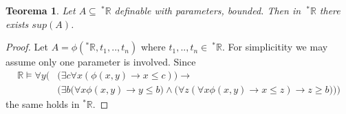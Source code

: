 \documentclass[11pt,a4paper]{article}
\newtheorem{theorem}{Teorema}
\theoremstyle{definition}
\theoremstyle{remark}
\begin{document}
\begin{theorem}

	Let $A \subseteq \ ^{*}\mathbb{R}$ definable with parameters, bounded. Then in $ \ ^{*}\mathbb{R}$ there exists $sup(A)$.
  
\end{theorem}

\begin{proof}

	Let $A = \phi(^{*}\mathbb{R},t_1,..,t_n)$ where $t_1,..,t_n \in \ ^{*}\mathbb{R}$.
	For simplicitity we may assume only one parameter is involved.
	Since
	\begin{align*}
		\mathbb{R} \models \forall y \bigg( & \big( \exists c \forall x (\phi(x,y) \to x \leq c) \big) \to \\
						& \big( \exists b \big( \forall x \phi(x,y) \to y \leq b \big) 
								\land \big( \forall z (\forall x \phi(x,y) \to x \leq z) \to z \geq b \big) \big) \bigg)
	\end{align*}
	the same holds in $^{*} \mathbb{R}$.
\end{proof}
\end{document}
